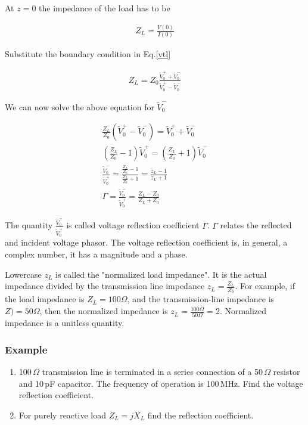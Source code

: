 \documentclass{ximera}
\begin{document}
At $z=0$ the impedance of the load has to be

\begin{eqnarray}
Z_L=\frac{V(0)}{I(0)} \nonumber 
\end{eqnarray}

Substitute the boundary condition in Eq.\ref{vtl}

\begin{eqnarray}
Z_L=Z_0 \frac{\tilde{V}_0^+ + \tilde{V}_0^-}{\tilde{V}_0^+ - \tilde{V}_0^-}
\end{eqnarray}


We can now solve the above equation for $\tilde{V}_0^-$

\begin{eqnarray}
\frac{Z_L}{Z_0} (\tilde{V}_0^+ - \tilde{V}_0^-) = \tilde{V}_0^+ + \tilde{V}_0^- \nonumber \\
(\frac{Z_L}{Z_0}-1)\tilde{V}_0^+ =(\frac{Z_L}{Z_0}+1) \tilde{V}_0^- \nonumber \\
\frac{\tilde{V}_0^-}{\tilde{V}_0^+} = \frac{\frac{Z_L}{Z_0}-1  }{ \frac{Z_L}{Z_0}+1 } = \frac{z_L-1}{z_L+1}
\nonumber \\
\Gamma=\frac{\tilde{V}_0^-}{\tilde{V}_0^+} = \frac{Z_L -Z_0}{Z_L +Z_0}
\end{eqnarray}

The quantity $\frac{\tilde{V}_0^-}{\tilde{V}_0^+}$ is called voltage reflection
coefficient $\Gamma$. $\Gamma$ relates the reflected and incident voltage
phasor. The voltage reflection coefficient is, in general, a complex number,
it has a magnitude and a phase.

 Lowercase $z_L$ is called the 
"normalized load impedance". It is the actual impedance divided by the transmission line impedance $z_L=\frac{Z_L}{Z_0}$. For example, if the load impedance is $Z_L=100 \Omega$, and the transmission-line impedance is $Z)=50 \Omega$, then the normalized impedance is $z_L=\frac{100 \Omega}{50 \Omega}=2$. Normalized impedance is a unitless quantity.



\subsubsection{Example}


 \begin{enumerate}
\item 100\,$\Omega$ transmission line is terminated in a series
connection of a 50\,$\Omega$ resistor and 10\,pF capacitor. The frequency
of operation is 100\,MHz. Find the voltage reflection coefficient.
\item For purely reactive load $Z_L=j X_L$ find the reflection
coefficient.
\end{enumerate}
\end{document}
